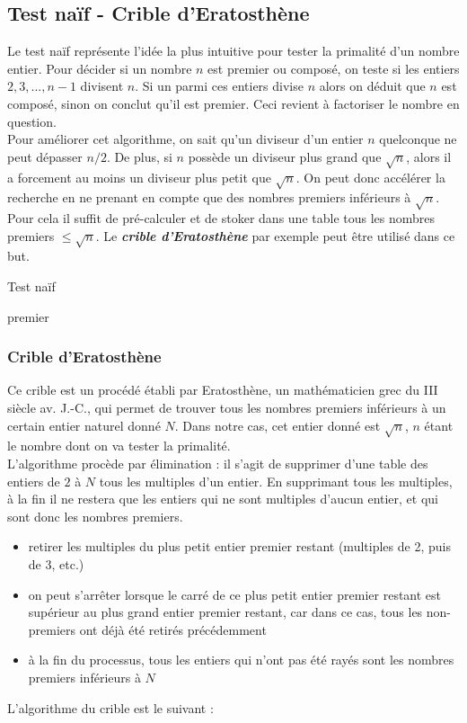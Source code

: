 	\subsection{Test naïf - Crible d’Eratosthène}
		Le test naïf représente l'idée la plus intuitive pour tester la primalité d'un nombre entier. Pour décider si un nombre $n$ est premier ou composé, on teste si les entiers $2, 3, ..., n-1$ divisent $n$. Si un parmi ces entiers divise $n$ alors on déduit que $n$ est composé, sinon on conclut qu'il est premier. Ceci revient à factoriser le nombre en question.\\
		Pour améliorer cet algorithme, on sait qu'un diviseur d'un entier $n$ quelconque ne peut dépasser $n/2$. De plus, si $n$ possède un diviseur plus grand que $\sqrt{n}$, alors il a forcement au moins un diviseur plus petit que $\sqrt{n}$. On peut donc accélérer la recherche en ne prenant en compte que des nombres premiers inférieurs à $\sqrt{n}$. Pour cela il suffit de pré-calculer et de stoker dans une table tous les nombres premiers $\leqslant \sqrt{n}$. Le \textbf{\textit{crible d'Eratosthène}} par exemple peut être utilisé dans ce but.\\
	
		\begin{algorithm}[H]
			\caption{Test naïf}\label{TN}
		\Retour premier\;
		\end{algorithm}
		
		\subsubsection*{Crible d'Eratosthène}
		Ce crible est un procédé établi par Eratosthène, un mathématicien grec  du III siècle av. J.-C., qui permet de trouver tous les nombres premiers inférieurs à un certain entier naturel donné $N$. Dans notre cas, cet entier donné est $\sqrt{n}$, $n$ étant le nombre dont on va tester la primalité.\\
		L'algorithme procède par élimination : il s'agit de supprimer d'une table des entiers de $2$ à $N$ tous les multiples d'un entier. En supprimant tous les multiples, à la fin il ne restera que les entiers qui ne sont multiples d'aucun entier, et qui sont donc les nombres premiers.
		\begin{itemize}
			\item retirer les multiples du plus petit entier premier restant (multiples de 2, puis de 3, etc.)
			\item on peut s'arrêter lorsque le carré de ce plus petit entier premier restant est supérieur au plus grand entier premier restant, car dans ce cas, tous les non-premiers ont déjà été retirés précédemment
			\item à la fin du processus, tous les entiers qui n'ont pas été rayés sont les nombres premiers inférieurs à $N$
		\end{itemize}
		L'algorithme du crible est le suivant :\\ 
		
